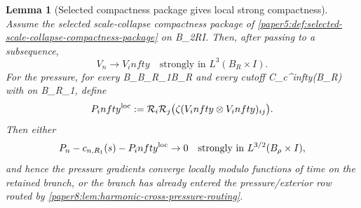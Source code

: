 \documentclass[11pt]{amsart}
\def\({}%
\def\){}%
\def\infty{infty}%
\theoremstyle{plain}
\newtheorem{lemma}[lemma]{Lemma}
\theoremstyle{definition}
\theoremstyle{remark}
\begin{document}
\begin{lemma}[Selected compactness package gives local strong compactness]
\label{paper5:lem:selected-compactness-aubin-lions}
Assume the selected scale-collapse compactness package of
\cref{paper5:def:selected-scale-collapse-compactness-package} on
\(B_{2R}\times I\).  Then, after passing to a subsequence,
\[
  V_n\to V_\infty
  \quad\text{strongly in }L^3(B_R\times I).
\]
For the pressure, for every
\(B_\rho\Subset B_{R_1}\Subset B_R\) and every cutoff
\(\zeta\in C_c^\infty(B_R)\) with \(\zeta{}\) on \(B_{R_1}\), define
\[
  P_\infty^{\rm loc}
  :=
  \mathcal R_i\mathcal R_j
  \bigl(\zeta(V_\infty\otimes V_\infty)_{ij}\bigr).
\]
Then either
\[
  P_n-c_{n,R_1}(s)-P_\infty^{\rm loc}\to0
  \quad\text{strongly in }L^{3/2}(B_\rho\times I),
\]
and hence the pressure gradients converge locally modulo functions of time on
the retained branch,
or the branch has already entered the pressure/exterior row routed by
\cref{paper8:lem:harmonic-cross-pressure-routing}.
\end{lemma}
\end{document}

